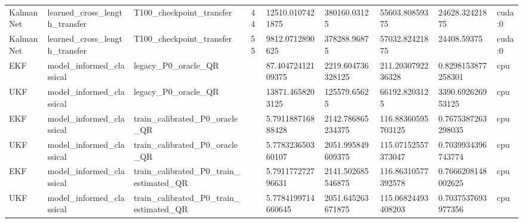 \begin{table}[t]
\begin{tabular}{lllllllll}
KalmanNet & learned\_cross\_length\_transfer & T100\_checkpoint\_transfer & 44 & 12510.0107421875 & 380160.03125 & 55603.80859375 & 24628.32421875 & cuda:0 \\
KalmanNet & learned\_cross\_length\_transfer & T100\_checkpoint\_transfer & 55 & 9812.0712890625 & 378288.96875 & 57032.82421875 & 24408.59375 & cuda:0 \\
EKF & model\_informed\_classical & legacy\_P0\_oracle\_QR &  & 87.40472412109375 & 2219.604736328125 & 211.2030792236328 & 0.8298153877258301 & cpu \\
UKF & model\_informed\_classical & legacy\_P0\_oracle\_QR &  & 13871.4658203125 & 125579.65625 & 66192.8203125 & 3390.692626953125 & cpu \\
EKF & model\_informed\_classical & train\_calibrated\_P0\_oracle\_QR &  & 5.791188716888428 & 2142.786865234375 & 116.88360595703125 & 0.7675387263298035 & cpu \\
UKF & model\_informed\_classical & train\_calibrated\_P0\_oracle\_QR &  & 5.778323650360107 & 2051.995849609375 & 115.07152557373047 & 0.7039934396743774 & cpu \\
EKF & model\_informed\_classical & train\_calibrated\_P0\_train\_estimated\_QR &  & 5.791177272796631 & 2141.502685546875 & 116.86310577392578 & 0.7666208148002625 & cpu \\
UKF & model\_informed\_classical & train\_calibrated\_P0\_train\_estimated\_QR &  & 5.7784199714660645 & 2051.645263671875 & 115.06824493408203 & 0.7037537693977356 & cpu \\
\hline
\end{tabular}
\end{table}
